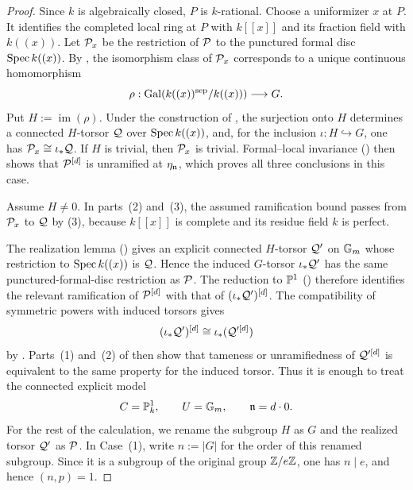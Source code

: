 \begin{proof}
Since $k$ is algebraically closed, $P$ is $k$-rational. Choose a uniformizer
$x$ at $P$. It identifies the completed local ring at $P$ with $k[[x]]$
and its fraction field with $k((x))$. Let $\mathcal{P}_x$ be the restriction of
$\mathcal{P}$ to the punctured formal disc $\operatorname{Spec} k((x))$. By
, the isomorphism class of
$\mathcal{P}_x$ corresponds to a unique continuous homomorphism
\[
    \rho:\operatorname{Gal}(k((x))^{\mathrm{sep}}/k((x)))\longrightarrow G.
\]
Put $H:=\operatorname{im}(\rho)$. Under the construction of
, the surjection onto $H$
determines a connected $H$-torsor $\mathcal{Q}$ over $\operatorname{Spec} k((x))$, and, for the
inclusion $\iota:H\hookrightarrow G$, one has
$\mathcal{P}_x\cong\iota_*\mathcal{Q}$.
If $H$ is trivial, then $\mathcal{P}_x$ is trivial. Formal--local invariance
() then shows that $\mathcal{P}^{[d]}$ is
unramified at $\eta_{\mathfrak{n}}$, which proves all three conclusions in this case.

Assume $H\neq0$. In parts~(2) and~(3), the assumed ramification bound passes
from $\mathcal{P}_x$ to $\mathcal{Q}$ by
(3), because $k[[x]]$ is complete
and its residue field $k$ is perfect.

The realization lemma () gives an explicit
connected $H$-torsor $\mathcal{Q}'$ on $\mathbb{G}_m$ whose restriction to
$\operatorname{Spec} k((x))$ is $\mathcal{Q}$. Hence the induced $G$-torsor $\iota_*\mathcal{Q}'$ has the
same punctured-formal-disc restriction as $\mathcal{P}$. The reduction to $\mathbb{P}^1$
() therefore identifies the relevant ramification
of $\mathcal{P}^{[d]}$ with that of $(\iota_*\mathcal{Q}')^{[d]}$. The compatibility of
symmetric powers with induced torsors gives
\[
    (\iota_*\mathcal{Q}')^{[d]}
       \cong\iota_*(\mathcal{Q}'^{[d]})
\]
by . Parts~(1) and~(2) of
 then show that tameness or
unramifiedness of $\mathcal{Q}'^{[d]}$ is equivalent to the same property for the
induced torsor. Thus it is enough to treat the connected explicit model
\[
    C=\mathbb{P}^1_k,\qquad U=\mathbb{G}_m,\qquad \mathfrak{n}=d\cdot0.
\]
For the rest of the calculation, we rename the subgroup $H$ as $G$ and the
realized torsor $\mathcal{Q}'$ as $\mathcal{P}$.
In Case~(1), write $n:=|G|$ for the order of this renamed subgroup. Since it
is a subgroup of the original group $\mathbb{Z}/e\mathbb{Z}$, one has $n\mid e$, and hence
$(n,p)=1$.


\end{proof}
